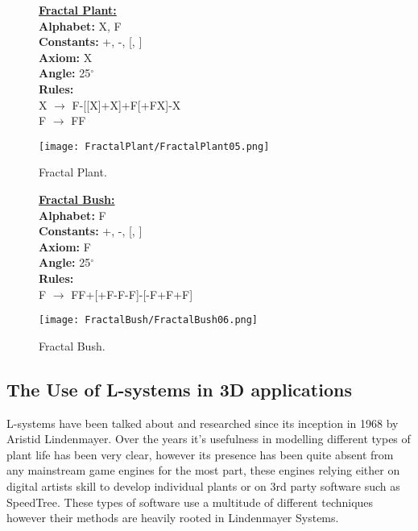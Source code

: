 \begin{figure}[htbp]
	\raggedright
	\textbf{\underline{Fractal Plant:}} \\
	\textbf{Alphabet:} X, F\\
	\textbf{Constants:} +, -, [, ] \\
	\textbf{Axiom:} X \\
	\textbf{Angle:} 25$^\circ$ \\
	\textbf{Rules:} \\
	X $\rightarrow$ F-[[X]+X]+F[+FX]-X\\
	F $\rightarrow$ FF \\
	{\centering
		\vspace{7px}
		\texttt{[image: FractalPlant/FractalPlant05.png]}
		\caption{Fractal Plant.}
	}
\end{figure}
\begin{figure}[htbp]
	\raggedright
	\textbf{\underline{Fractal Bush:}} \\
	\textbf{Alphabet:} F\\
	\textbf{Constants:} +, -, [, ] \\
	\textbf{Axiom:} F \\
	\textbf{Angle:} 25$^\circ$ \\
	\textbf{Rules:} \\
	F $\rightarrow$ FF+[+F-F-F]-[-F+F+F]\\
	{\centering
		\vspace{7px}
		\texttt{[image: FractalBush/FractalBush06.png]}
		\caption{Fractal Bush.}
	}
\end{figure}

\FloatBarrier
\newpage

\subsection{The Use of L-systems in 3D applications}

L-systems have been talked about and researched since its inception in 1968 by Aristid Lindenmayer. Over the years it's usefulness in modelling different types of plant life has been very clear, however its presence has been quite absent from any mainstream game engines for the most part, these engines relying either on digital artists skill to develop individual plants or on 3rd party software such as SpeedTree. These types of software use a multitude of different techniques however their methods are heavily rooted in Lindenmayer Systems. 

